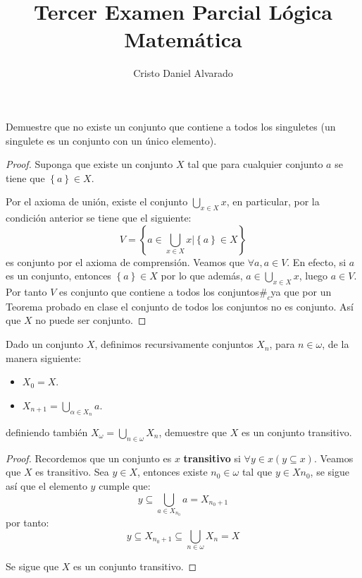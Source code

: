 \documentclass[12pt]{article}
\newcounter{it}
\theoremstyle{largebreak}
\newcommand\contradiction{\ensuremath{\#_c}}
\begin{document}
    \setlength{\parskip}{5pt} %
    \setlength{\parindent}{12pt} %
    \title{Tercer Examen Parcial Lógica Matemática}
    \author{Cristo Daniel Alvarado}
    \maketitle

    \begin{excer}
        Demuestre que no existe un conjunto que contiene a todos los singuletes (un singulete es un conjunto con un único elemento).
    \end{excer}

    \begin{proof}
        Suponga que existe un conjunto $X$ tal que para cualquier conjunto $a$ se tiene que $\left\{a\right\}\in X$.

        Por el axioma de unión, existe el conjunto $\bigcup_{ x\in X}x$, en particular, por la condición anterior se tiene que el siguiente:
        \begin{equation*}
            V=\left\{a\in\bigcup_{ x\in X}x\Big|\left\{a\right\}\in X  \right\}
        \end{equation*}
        es conjunto por el axioma de comprensión. Veamos que $\forall a, a\in V$. En efecto, si $a$ es un conjunto, entonces $\left\{a\right\}\in X$ por lo que además, $a\in\bigcup_{ x\in X}x$, luego $a\in V$. Por tanto $V$ es conjunto que contiene a todos los conjuntos\contradiction ya que por un Teorema probado en clase el conjunto de todos los conjuntos no es conjunto. Así que $X$ no puede ser conjunto. 
    \end{proof}
    
    \begin{excer}
        Dado un conjunto $X$, definimos recursivamente conjuntos $X_n$, para $n\in\omega$, de la manera siguiente:
        \begin{itemize}
            \item $X_0=X$.
            \item $X_{ n+1}=\bigcup_{\alpha\in X_n}a$.
        \end{itemize}
        definiendo también $X_{\omega}=\bigcup_{ n\in\omega}X_n$, demuestre que $X$ es un conjunto transitivo.
    \end{excer}

    \begin{proof}
        Recordemos que un conjunto es $x$ \textbf{transitivo} si $\forall y\in x(y\subseteq x)$. Veamos que $X$ es transitivo. Sea $y\in X$, entonces existe $n_0\in\omega$ tal que $y\in X{n_0}$, se sigue así que el elemento $y$ cumple que:
        \begin{equation*}
            y\subseteq\bigcup_{ a\in X_{n_0}}a=X_{n_0+1}
        \end{equation*}
        por tanto:
        \begin{equation*}
            y\subseteq X_{ n_0+1}\subseteq\bigcup_{ n\in\omega}X_n=X
        \end{equation*}
        
        Se sigue que $X$ es un conjunto transitivo.
    \end{proof}
\end{document}
